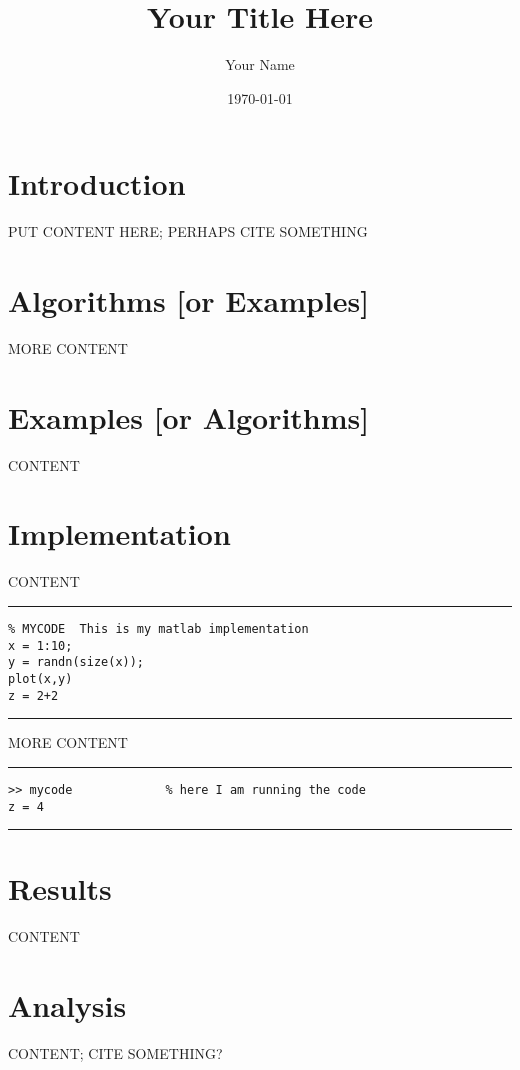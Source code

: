 \documentclass[12pt]{amsart}
\begin{document}
\title{Your Title Here}

\author{Your Name}

\date{\today}

\maketitle

\section{Introduction}  PUT CONTENT HERE; PERHAPS CITE SOMETHING \cite{einstein}


\section{Algorithms [or Examples]}  MORE CONTENT

\section{Examples [or Algorithms]}  CONTENT

\section{Implementation}  CONTENT

\bigskip
\hrule
\begin{verbatim}
% MYCODE  This is my matlab implementation
x = 1:10;
y = randn(size(x));
plot(x,y)
z = 2+2
\end{verbatim}
\hrule
\bigskip

MORE CONTENT

\bigskip
\hrule
\begin{verbatim}
>> mycode             % here I am running the code
z = 4
\end{verbatim}
\hrule

\section{Results}  CONTENT

\section{Analysis}  CONTENT; CITE SOMETHING? \cite{grivanashsofer}
\end{document}

